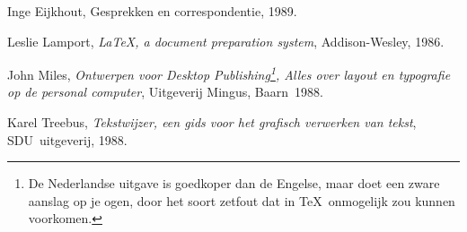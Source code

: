 \documentclass[a4paper]{artikel1} %
\begin{document}
\begin{thebibliography}{9}
 
Inge Eijkhout, Gesprekken en correspondentie, 1989.
 
Leslie Lamport, \emph{\LaTeX, a document preparation
    system}, Addison-Wesley, 1986.
 
John Miles, \emph{Ontwerpen voor Desktop
    Publishing\footnote{De Nederlandse uitgave is goedkoper dan de
      Engelse, maar doet een zware aanslag op je ogen, door het soort
      zetfout dat in \TeX\ onmogelijk zou kunnen voorkomen.}, Alles
    over layout en typografie op de personal computer}, Uitgeverij
  Mingus, Baarn~1988.
 
Karel Treebus, \emph{Tekstwijzer, een gids voor het
    grafisch verwerken van tekst}, SDU~uitgeverij, 1988.
 
\end{thebibliography}
 
 
\newpage
\tableofcontents
\listoftables
\listoffigures
 
\end{document}
